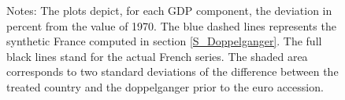 \documentclass[12pt]{article}
\newcommand{\annote}[1]{\parbox{\textwidth}{\renewcommand{\baselinestretch}{1.0}\vspace{12pt} \small Notes: #1}}
\begin{document}
\begin{appendices}
\begin{figure}[h!]
    \annote{The plots depict, for each GDP component, the deviation in percent from the value of 1970. The blue dashed lines represents the synthetic France computed in section \ref{S_Doppelganger}. The full black lines stand for the actual French series. The shaded area corresponds to two standard deviations of the difference between the treated country and the doppelganger prior to the euro accession. }
\end{figure}


\end{appendices}
\end{document}
